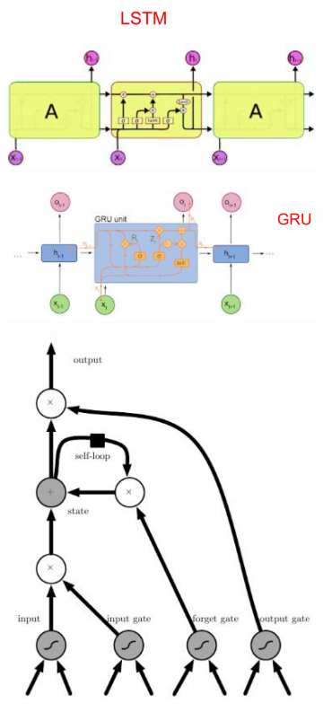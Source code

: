 \begin{figure}[ht]
	\centering
	\begin{subfigure}{.33\textwidth}
		\centering
		\includegraphics[width=1\linewidth]{figure_ml/lstm.png}
	\end{subfigure}%
	\begin{subfigure}{.33\textwidth}
		\centering
		\includegraphics[width=1\linewidth]{figure_ml/gru.png}
	\end{subfigure}%
	\begin{subfigure}{.33\textwidth}
		\centering
		\includegraphics[width=1\linewidth]{figure_ml/gates.png}

\end{subfigure}
\end{figure}
